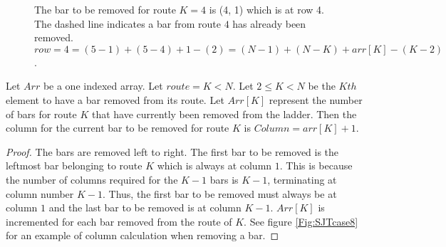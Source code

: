 \begin{figure}[!htp]
  \begin{center}
  \end{center}
  \caption{The bar to be removed for route $K=4$ is (4, 1) which is at row 4. The dashed line indicates a bar 
  from route $4$ has already been removed. $row= 4 = (5-1)+(5-4)+ 1 - (2) = (N-1)+(N-K) + arr[K] - (K-2)$.}

  \label{fig:SJTcase7}
\end{figure}

\begin{lemma}
   Let $Arr$ be a one indexed array. Let $route=K < N$. Let $2 \leq K < N$ be the $Kth$ element to have a bar removed from its route. 
  Let $Arr[K]$ represent the number of bars for route $K$ that have currently been removed from the ladder. 
  Then the column for the current bar to be removed for route $K$ is $Column=arr[K]+1$.
\end{lemma}
\begin{proof}
  The bars are removed left to right. The first bar to be removed is the leftmost bar belonging to route $K$ which 
  is always at column $1$. This is because the number of columns required for the $K-1$ bars is $K-1$, terminating at 
  column number $K-1$. Thus, the first bar to be removed must always be at column $1$ and the last bar to 
  be removed is at column $K-1$. $Arr[K]$ is incremented for each bar removed from the route of $K$. See figure \ref{Fig:SJTcase8}
  for an example of column calculation when removing a bar.
\end{proof}

